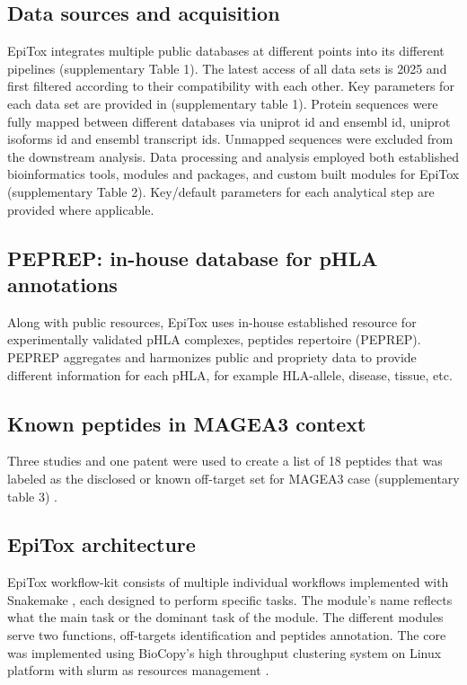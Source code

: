 \documentclass[unnumsec,webpdf,contemporary,large]{oup-authoring-template}%
\theoremstyle{thmstyleone}%
\theoremstyle{thmstyletwo}%
\theoremstyle{thmstylethree}%
\begin{document}
    \subsection{Data sources and acquisition}
        EpiTox integrates multiple public databases at different points into its different pipelines (supplementary Table 1). The latest access of all data sets is 2025 and first filtered according to their compatibility with each other. Key parameters for each data set are provided in (supplementary table 1). Protein sequences were fully mapped between different databases via uniprot id and ensembl id, uniprot isoforms id and ensembl transcript ids. Unmapped sequences were excluded from the downstream analysis. Data processing and analysis employed both established bioinformatics tools, modules and packages, and custom built modules for EpiTox (supplementary Table 2). Key/default parameters for each analytical step are provided where applicable. 
        
    \subsection{\textbf{PEPREP: in-house database for pHLA annotations}} \label{sec:peprep}  
        Along with public resources, EpiTox uses in-house established resource for experimentally validated pHLA complexes, peptides repertoire (PEPREP). PEPREP aggregates and harmonizes public and propriety data to provide different information for each pHLA, for example HLA-allele, disease, tissue, etc.

    \subsection{\textbf{Known peptides in MAGEA3 context}} \label{sec:known_OT}  
        Three studies and one patent were used to create a list of 18 peptides that was labeled as the disclosed or known off-target set for MAGEA3 case (supplementary table 3) \cite{WO2021173674A1, chinnasamy2011tcr, morgan2013cancer, dhanik2016silico}. 

    \subsection{\textbf{EpiTox architecture}} \label{sec:epitox_archticture}  
        EpiTox workflow-kit consists of multiple individual workflows implemented with Snakemake \cite{molder2025sustainable}, each designed to perform specific tasks. The module's name reflects what the main task or the dominant task of the module. The different modules serve two functions, off-targets identification and peptides annotation. The core was implemented using BioCopy's high throughput clustering system on Linux platform with slurm as resources management \cite{simakov2018slurm}.
    
\end{document}
